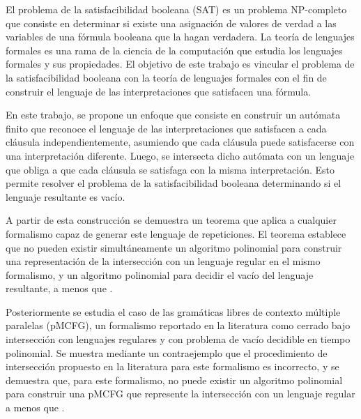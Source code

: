 \begin{resumen}
	El problema de la satisfacibilidad booleana (SAT) es un problema NP-completo que consiste en determinar si existe una asignación de valores de verdad a las variables de una fórmula booleana que la hagan verdadera. La teoría de lenguajes formales es una rama de la ciencia de la computación que estudia los lenguajes formales y sus propiedades. El objetivo de este trabajo es vincular el problema de la satisfacibilidad booleana con la teoría de lenguajes formales con el fin de construir el lenguaje de las interpretaciones que satisfacen una fórmula.

	En este trabajo, se propone un enfoque que consiste en construir un autómata finito que reconoce el lenguaje de las interpretaciones que satisfacen a cada cláusula independientemente, asumiendo que cada cláusula puede satisfacerse con una interpretación diferente. Luego, se intersecta dicho autómata con un lenguaje que obliga a que cada cláusula se satisfaga con la misma interpretación. Esto permite resolver el problema de la satisfacibilidad booleana determinando si el lenguaje resultante es vacío.

	A partir de esta construcción se demuestra un teorema que aplica a cualquier formalismo capaz de generar este lenguaje de repeticiones. El teorema establece que no pueden existir simultáneamente un algoritmo polinomial para construir una representación de la intersección con un lenguaje regular en el mismo formalismo, y un algoritmo polinomial para decidir el vacío del lenguaje resultante, a menos que \pnp.

	Posteriormente se estudia el caso de las gramáticas libres de contexto múltiple paralelas (pMCFG), un formalismo reportado en la literatura como cerrado bajo intersección con lenguajes regulares y con problema de vacío decidible en tiempo polinomial. Se muestra mediante un contraejemplo que el procedimiento de intersección propuesto en la literatura para este formalismo es incorrecto, y se demuestra que, para este formalismo, no puede existir un algoritmo polinomial para construir una pMCFG que represente la intersección con un lenguaje regular a menos que \pnp.
\end{resumen}

